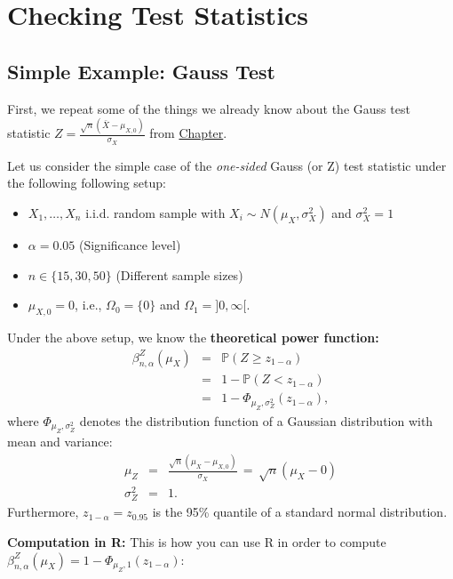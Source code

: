\documentclass[
]{book}
\providecommand{\tightlist}{%
  \setlength{\itemsep}{0pt}\setlength{\parskip}{0pt}}
\begin{document}
\hypertarget{checking-test-statistics}{%
\section{Checking Test Statistics}\label{checking-test-statistics}}

\hypertarget{simple-example-gauss-test}{%
\subsection{Simple Example: Gauss Test}\label{simple-example-gauss-test}}

First, we repeat some of the things we already know about the Gauss test statistic \(Z=\frac{\sqrt{n}(\bar{X}-\mu_{X,0})}{\sigma_X}\) from \protect\hyperlink{PF1}{Chapter}.

Let us consider the simple case of the \emph{one-sided} Gauss (or Z) test statistic under the following following setup:

\begin{itemize}
\tightlist
\item
  \(X_1,\dots,X_n\) i.i.d. random sample with \(X_i\sim N(\mu_X,\sigma_X^2)\) and \(\sigma_X^2=1\)
\item
  \(\alpha=0.05\) (Significance level)
\item
  \(n\in\{15,30,50\}\) (Different sample sizes)
\item
  \(\mu_{X,0}=0\), i.e., \(\Omega_0=\{0\}\) and \(\Omega_1=]0,\infty[\).
\end{itemize}

Under the above setup, we know the \textbf{theoretical power function:}
\[
\begin{array}{rcl}
\beta^{Z}_{n,\alpha}(\mu_X)
&=&\mathbb{P}(Z \geq z_{1-\alpha})\\
&=&1-\mathbb{P}(Z < z_{1-\alpha})\\
&=&1-\Phi_{\mu_Z,\sigma^2_Z}(z_{1-\alpha}),
\end{array}
\]
where \(\Phi_{\mu_Z,\sigma_Z^2}\) denotes the distribution function of a Gaussian distribution with mean and variance:
\[
\begin{array}{rcl}
\mu_Z&=&\frac{\sqrt{n}(\mu_X-\mu_{X,0})}{\sigma_X}
\,=\,\sqrt{n}(\mu_X-0)\\
\sigma^2_Z&=&1.
\end{array}
\]
Furthermore, \(z_{1-\alpha}=z_{0.95}\) is the 95\% quantile of a standard normal distribution.

\textbf{Computation in R:}
This is how you can use R in order to compute \(\beta^{Z}_{n,\alpha}(\mu_X)=1-\Phi_{\mu_Z,1}(z_{1-\alpha})\):
\end{document}
